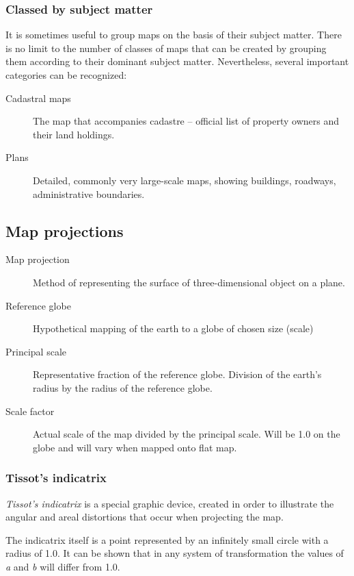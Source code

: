 \documentclass[letterpaper]{article}
\begin{document}
\subsubsection{Classed by subject matter}
\label{sec:class-subj-matt}

It is sometimes useful to group maps on the basis of their subject matter.
There is no limit to the number of classes of maps that can be created by
grouping them according to their dominant subject matter.
Nevertheless, several important categories can be recognized:

\begin{description}
\item[Cadastral maps] The map that accompanies cadastre -- official list of
property owners and their land holdings.
\item[Plans] Detailed, commonly very large-scale maps, showing buildings, roadways, administrative
  boundaries.
\end{description}

\subsection{Map projections}

\begin{description}
\item[Map projection] Method of representing the surface of three-dimensional object on a plane.
\item[Reference globe] Hypothetical mapping of the earth to a globe of chosen size (scale)
\item[Principal scale] Representative fraction of the reference globe. Division of the earth's
  radius by the radius of the reference globe.
\item[Scale factor] Actual scale of the map divided by the principal scale. Will be 1.0 on the globe and will vary when mapped onto flat map.
\end{description}

\subsubsection{Tissot's indicatrix}
\label{sec:tissots-indicatrix}

\emph{Tissot's indicatrix} is a special graphic device, created in order to
illustrate the angular and areal distortions that occur when projecting the map.

The indicatrix itself is a point represented by an infinitely small circle with
a radius of 1.0. It can be shown that in any system of transformation the values
of \textit{a} and \textit{b} will differ from 1.0.
\end{document}
